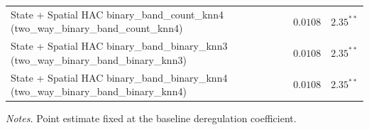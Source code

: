 \begin{table}[htbp]
\begin{tabular}{lcc}
    State + Spatial HAC binary\_band\_count\_knn4 (two\_way\_binary\_band\_count\_knn4) & $0.0108$ & $2.35^{**}$ \\
    State + Spatial HAC binary\_band\_binary\_knn3 (two\_way\_binary\_band\_binary\_knn3) & $0.0108$ & $2.35^{**}$ \\
    State + Spatial HAC binary\_band\_binary\_knn4 (two\_way\_binary\_band\_binary\_knn4) & $0.0108$ & $2.35^{**}$ \\
    \bottomrule
  \end{tabular}
  \begin{tablenotes}\footnotesize
  \item \emph{Notes.} Point estimate fixed at the baseline deregulation coefficient.
  \end{tablenotes}
\end{table}

\clearpage
 
